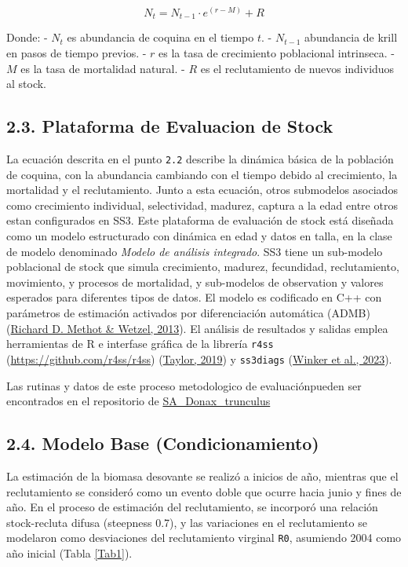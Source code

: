 \documentclass[
]{article}
\begin{document}
\[
N_t = N_{t-1} \cdot e^{(r - M)} + R
\]

Donde:
- \(N_t\) es abundancia de coquina en el tiempo \(t\).
- \(N_{t-1}\) abundancia de krill en pasos de tiempo previos.
- \(r\) es la tasa de crecimiento poblacional intrinseca.
- \(M\) es la tasa de mortalidad natural.
- \(R\) es el reclutamiento de nuevos individuos al stock.

\hypertarget{plataforma-de-evaluacion-de-stock}{%
\subsection{2.3. Plataforma de Evaluacion de Stock}\label{plataforma-de-evaluacion-de-stock}}

La ecuación descrita en el punto \texttt{2.2} describe la dinámica básica de la población de coquina, con la abundancia cambiando con el tiempo debido al crecimiento, la mortalidad y el reclutamiento. Junto a esta ecuación, otros submodelos asociados como crecimiento individual, selectividad, madurez, captura a la edad entre otros estan configurados en SS3. Este plataforma de evaluación de stock está diseñada como un modelo estructurado con dinámica en edad y datos en talla, en la clase de modelo denominado \emph{Modelo de análisis integrado}. SS3 tiene un sub-modelo poblacional de stock que simula crecimiento, madurez, fecundidad, reclutamiento, movimiento, y procesos de mortalidad, y sub-modelos de observation y valores esperados para diferentes tipos de datos. El modelo es codificado en C++ con parámetros de estimación activados por diferenciación automática (ADMB) (\protect\hyperlink{ref-Methot2013}{Richard D. Methot \& Wetzel, 2013}). El análisis de resultados y salidas emplea herramientas de R e interfase gráfica de la librería \texttt{r4ss} (\url{https://github.com/r4ss/r4ss}) (\protect\hyperlink{ref-Taylor2019}{Taylor, 2019}) y \texttt{ss3diags} (\protect\hyperlink{ref-Henning2023}{Winker et al., 2023}).

Las rutinas y datos de este proceso metodologico de evaluaciónpueden ser encontrados en el repositorio de \href{https://github.com/MauroMardones/SA_Donax_trunculus.}{SA\_Donax\_trunculus}

\hypertarget{modelo-base-condicionamiento}{%
\subsection{2.4. Modelo Base (Condicionamiento)}\label{modelo-base-condicionamiento}}

La estimación de la biomasa desovante se realizó a inicios de año, mientras que el reclutamiento se consideró como un evento doble que ocurre hacia junio y fines de año. En el proceso de estimación del reclutamiento, se incorporó una relación stock-recluta difusa (steepness 0.7), y las variaciones en el reclutamiento se modelaron como desviaciones del reclutamiento virginal \texttt{R0}, asumiendo 2004 como año inicial (Tabla \ref{Tab1}).
\end{document}
